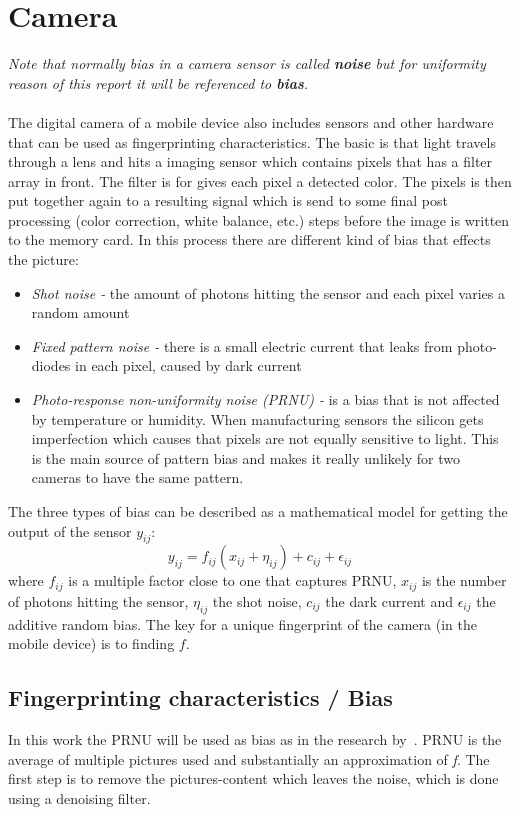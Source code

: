 \section{Camera}\label{sec:char:camera}
\textit{Note that normally bias in a camera sensor is called \textbf{noise} but for uniformity reason of this report it will be referenced to \textbf{bias}.}\\
\\
The digital camera of a mobile device also includes sensors and other hardware that can be used as fingerprinting characteristics. The basic is that light travels through a lens and hits a imaging sensor which contains pixels that has a filter array in front. The filter is for gives each pixel a detected color. The pixels is then put together again to a resulting signal which is send to some final post processing (color correction, white balance, etc.) steps before the image is written to the memory card. In this process there are different kind of bias that effects the picture:
\begin{itemize}
	\item \textit{Shot noise -} the amount of photons hitting the sensor and each pixel varies a random amount
	\item \textit{Fixed pattern noise - }there is a small electric current that leaks from photo-diodes in each pixel, caused by dark current
	\item \textit{Photo-response non-uniformity noise (PRNU) -} is a bias that is not affected by temperature or humidity. When manufacturing sensors the silicon gets imperfection which causes that pixels are not equally sensitive to light. This is the main source of pattern bias and makes it really unlikely for two cameras to have the same pattern.
\end{itemize}
The three types of bias can be described as a mathematical model for getting the output of the sensor $y_{ij}$:
$$y_{ij}=f_{ij}(x_{ij}+\eta_{ij})+c_{ij}+\epsilon_{ij}$$
where $f_{ij}$ is a multiple factor close to one that captures PRNU, $x_{ij}$ is the number of photons hitting the sensor, $\eta_{ij}$ the shot noise, $c_{ij}$ the dark current and $\epsilon_{ij}$ the additive random bias. The key for a unique fingerprint of the camera (in the mobile device) is to finding $f$.~\cite[]{sensor:camera:DCIdent}

\subsection{Fingerprinting characteristics / Bias}
In this work the PRNU will be used as bias as in the research by~\cite{sensor:camera:DCIdent}. PRNU is the average of multiple pictures used and substantially an approximation of \textit{f}. The first step is to remove the pictures-content which leaves the noise, which is done using a denoising filter. 

